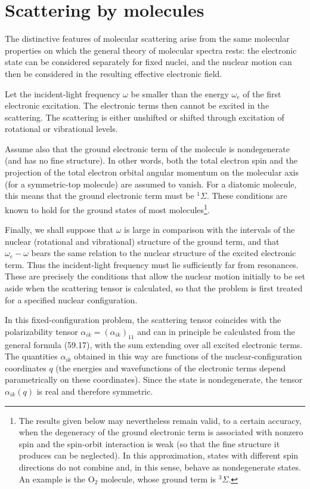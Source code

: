 \section{Scattering by molecules}

The distinctive features of molecular scattering arise from the same molecular properties on which the general theory of molecular spectra rests: the electronic state can be considered separately for fixed nuclei, and the nuclear motion can then be considered in the resulting effective electronic field.

Let the incident-light frequency $\omega$ be smaller than the energy $\omega_e$ of the first electronic excitation. The electronic terms then cannot be excited in the scattering. The scattering is either unshifted or shifted through excitation of rotational or vibrational levels.

Assume also that the ground electronic term of the molecule is nondegenerate (and has no fine structure). In other words, both the total electron spin and the projection of the total electron orbital angular momentum on the molecular axis (for a symmetric-top molecule) are assumed to vanish. For a diatomic molecule, this means that the ground electronic term must be $^{1}\Sigma$. These conditions are known to hold for the ground states of most molecules\footnote{The results given below may nevertheless remain valid, to a certain accuracy, when the degeneracy of the ground electronic term is associated with nonzero spin and the spin-orbit interaction is weak (so that the fine structure it produces can be neglected). In this approximation, states with different spin directions do not combine and, in this sense, behave as nondegenerate states. An example is the $\mathrm O_2$ molecule, whose ground term is $^{3}\Sigma$.}.

Finally, we shall suppose that $\omega$ is large in comparison with the intervals of the nuclear (rotational and vibrational) structure of the ground term, and that $\omega_e-\omega$ bears the same relation to the nuclear structure of the excited electronic term. Thus the incident-light frequency must lie sufficiently far from resonances. These are precisely the conditions that allow the nuclear motion initially to be set aside when the scattering tensor is calculated, so that the problem is first treated for a specified nuclear configuration.

In this fixed-configuration problem, the scattering tensor coincides with the polarizability tensor $\alpha_{ik}=(\alpha_{ik})_{11}$ and can in principle be calculated from the general formula (59.17), with the sum extending over all excited electronic terms. The quantities $\alpha_{ik}$ obtained in this way are functions of the nuclear-configuration coordinates $q$ (the energies and wavefunctions of the electronic terms depend parametrically on these coordinates). Since the state is nondegenerate, the tensor $\alpha_{ik}(q)$ is real and therefore symmetric.

